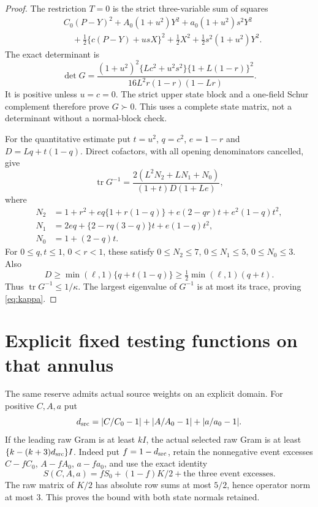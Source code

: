 \documentclass[11pt]{article}
\begin{document}
\begin{proof}
The restriction $T=0$ is the strict three-variable sum of squares
\begin{align*}
 &C_0(P-Y)^2+A_0(1+u^2)Y^2+a_0(1+u^2)s^2Y^2\\
 &\hspace{1em}+\tfrac12\{c(P-Y)+usX\}^2
       +\tfrac12X^2+\tfrac12s^2(1+u^2)Y^2.
\end{align*}
The exact determinant is
\[
 \det G=\frac{(1+u^2)^2\{Lc^2+u^2s^2\}
                    \{1+L(1-r)\}^2}
                   {16L^2r(1-r)(1-Lr)}.
\]
It is positive unless $u=c=0$.  The strict upper state block and a
one-field Schur complement therefore prove $G\succ0$.  This uses a
complete state matrix, not a determinant without a normal-block check.

For the quantitative estimate put $t=u^2$, $q=c^2$, $e=1-r$ and
$D=Lq+t(1-q)$.  Direct cofactors, with all opening denominators
cancelled, give
\[
 \operatorname{tr}G^{-1}
 =\frac{2(L^2N_2+LN_1+N_0)}{(1+t)D(1+Le)},
\]
where
\begin{align*}
 N_2&=1+r^2+eq\{1+r(1-q)\}+e(2-qr)t+e^2(1-q)t^2,\\
 N_1&=2eq+\{2-rq(3-q)\}t+e(1-q)t^2,\\
 N_0&=1+(2-q)t.
\end{align*}
For $0\leq q,t\leq1$, $0<r<1$, these satisfy
$0\leq N_2\leq7$, $0\leq N_1\leq5$, $0\leq N_0\leq3$.
Also
\[
 D\geq\min(\ell,1)\{q+t(1-q)\}
    \geq\tfrac12\min(\ell,1)(q+t).
\]
Thus $\operatorname{tr}G^{-1}\leq1/\kappa$.
The largest eigenvalue of $G^{-1}$ is at most its trace, proving
\eqref{eq:kappa}.
\end{proof}

\section*{Explicit fixed testing functions on that annulus}

The same reserve admits actual source weights on an explicit domain.
For positive $C,A,a$ put
\[
 d_{\rm src}=|C/C_0-1|+|A/A_0-1|+|a/a_0-1|.
\]
If the leading raw Gram is at least $kI$, the actual selected raw Gram
is at least $\{k-(k+3)d_{\rm src}\}I$.  Indeed put $f=1-d_{\rm src}$,
retain the nonnegative event excesses $C-fC_0$, $A-fA_0$, $a-fa_0$,
and use the exact identity
\[
 S(C,A,a)=fS_0+(1-f)K/2+\text{the three event excesses}.
\]
The raw matrix of $K/2$ has absolute row sums at most $5/2$, hence
operator norm at most $3$.  This proves the bound with both state
normals retained.
\end{document}
